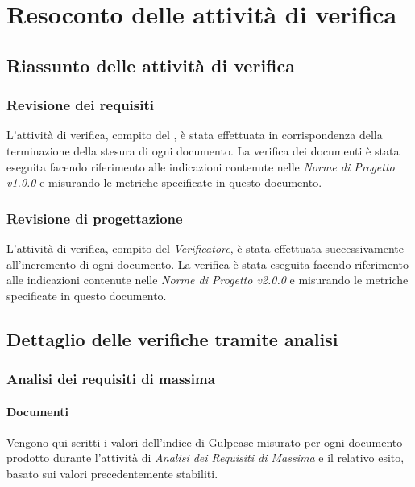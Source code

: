 \appendix
\section{Resoconto delle attività di verifica}
	\subsection{Riassunto delle attività di verifica}
	\subsubsection{Revisione dei requisiti}
	L'attività di verifica, compito del \emph{}, è stata effettuata in corrispondenza della terminazione della stesura di ogni documento. La verifica dei documenti è stata eseguita facendo riferimento alle indicazioni contenute nelle \emph{Norme di Progetto v1.0.0} e misurando le metriche specificate in questo documento.
	\subsubsection{Revisione di progettazione}
	L'attività di verifica, compito del \emph{Verificatore}, è stata effettuata successivamente all'incremento di ogni documento. La verifica è stata eseguita facendo riferimento alle indicazioni contenute nelle \emph{Norme di Progetto v2.0.0} e misurando le metriche specificate in questo documento.
	
	\subsection{Dettaglio delle verifiche tramite analisi}
	\subsubsection{Analisi dei requisiti di massima}
	\paragraph{Documenti} \Spazio
	Vengono qui scritti i valori dell'indice di Gulpease misurato per ogni documento prodotto durante l'attività di \textit{Analisi dei Requisiti di Massima} e il relativo esito, basato sui valori precedentemente stabiliti.
	

